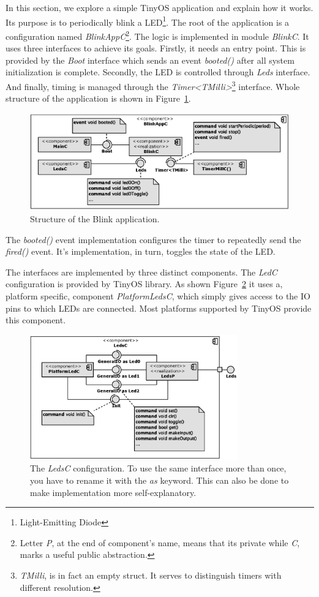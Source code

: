 In this section, we explore a simple TinyOS application and explain
how it works. Its purpose is to periodically blink a
LED\footnote{Light-Emitting Diode}. The root of the application is a
configuration named \emph{BlinkAppC}\footnote{Letter \emph{P}, at the end
of component's name, means that its private while \emph{C}, marks a
useful public abstraction.}. The logic is implemented in module \emph{BlinkC}.
It uses three interfaces to achieve its goals. Firstly, it needs an
entry point. This is provided by the \emph{Boot} interface which sends an
event \emph{booted()} after all system initialization is complete.
Secondly, the LED is controlled through \emph{Leds} interface.
And finally, timing is managed through the
\emph{Timer<TMilli>}\footnote{\emph{TMilli}, is in fact an empty
struct. It serves to distinguish timers with different resolution.}
interface. Whole structure of the application is shown in
Figure~\ref{fig:app_anatomy}.
\begin{figure}[h]
  \centering
  \includegraphics[width=1.01\textwidth]{diagrams/app_anatomy.eps}
  \caption{Structure of the Blink application.}
  \label{fig:app_anatomy}
\end{figure}
The \emph{booted()} event implementation configures the timer to
repeatedly send the \emph{fired()} event. It's implementation, in
turn, toggles the state of the LED.

The interfaces are implemented by three distinct components.
The \emph{LedC} configuration is provided by TinyOS library.
As shown Figure~\ref{fig:ledc} it uses a, platform specific, component
\emph{PlatformLedsC}, which simply gives access to the IO pins to
which LEDs are connected. Most platforms supported by TinyOS provide
this component.
\begin{figure}[h]
  \centering
  \includegraphics[width=0.8\textwidth]{diagrams/ledsc.eps}
  \caption{The \emph{LedsC} configuration. To use the same interface
  more than once, you have to rename it with the \emph{as} keyword.
  This can also be done to make implementation more self-explanatory.}
  \label{fig:ledc}
\end{figure}

